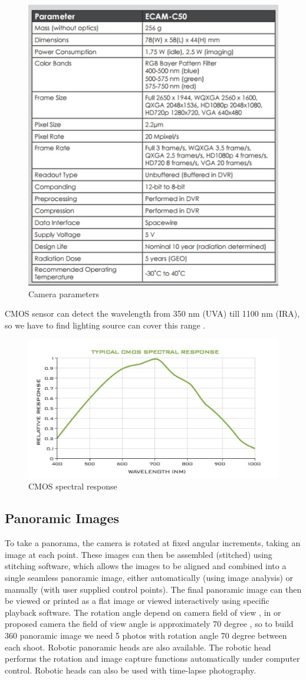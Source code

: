 \begin{figure}[htb]
\centering
\includegraphics[width=.48\textwidth]{figures/camera/bh10.jpg}
\caption{Camera parameters}
\end{figure}

CMOS sensor can detect the wavelength from 350 nm (UVA) till 1100 nm (IRA), so we have to find lighting source can cover this range .

\begin{figure}[htb]
\centering
\includegraphics[scale=1]{figures/camera/bh9.jpg}
\caption{CMOS spectral response}
\end{figure}

\subsection{Panoramic Images}

To take a panorama, the camera is rotated at fixed angular increments, taking an image at each point. These images can then be assembled (stitched) using stitching software, which allows the images to be aligned and combined into a single seamless panoramic image, either automatically (using image analysis) or manually (with user supplied control points). The final panoramic image can then be viewed or printed as a flat image or viewed interactively using specific playback software.
The rotation angle depend on camera field of view , in or proposed camera the field of view angle is approximately 70 degree , so to build 360 panoramic image we need 5 photos with rotation angle 70 degree between each shoot.
Robotic panoramic heads are also available. The robotic head performs the rotation and image capture functions automatically under computer control. Robotic heads can also be used with time-lapse photography.
